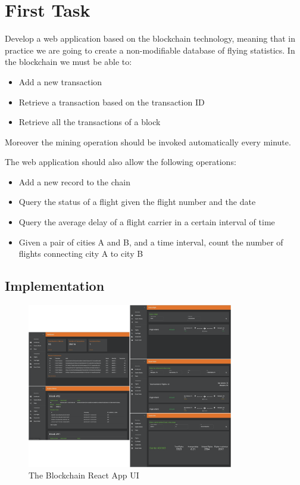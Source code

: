 \documentclass[11pt]{scrartcl} %
\begin{document}
\section{First Task}

Develop a web application based on the blockchain technology, meaning that in practice we are going to create a non-modifiable database of flying statistics. In the blockchain we must be able to: 
\begin{itemize}
\item[\adforn{43}] Add a new transaction
\item[\adforn{43}] Retrieve a transaction based on the transaction ID
\item[\adforn{43}] Retrieve all the transactions of a block
\end{itemize}

Moreover the mining operation should be invoked automatically every minute. 

The web application should also allow the following operations:
\begin{itemize}
\item[\adforn{43}] Add a new record to the chain
\item[\adforn{43}] Query the status of a flight given the flight number and the date
\item[\adforn{43}] Query the average delay of a flight carrier in a certain interval of time
\item[\adforn{43}] Given a pair of cities A and B, and a time interval, count the number of flights connecting city A to city B
\end{itemize}

\subsection{Implementation}

\begin{figure}[h]
\includegraphics[width=9cm]{Images/frontend.png}
\centering
\caption{The Blockchain React App UI}
\label{fig:frontend}
\end{figure}
\end{document}
